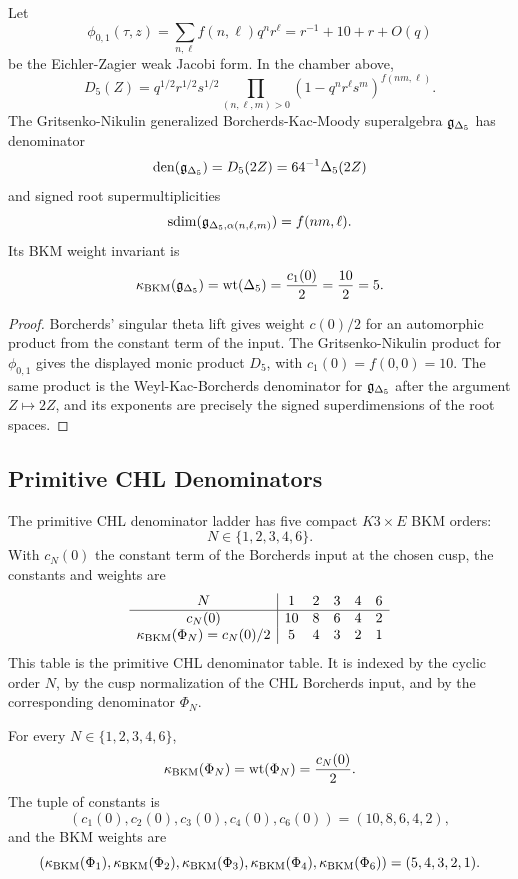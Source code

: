\begin{theorem}
\label{thm:delta5-bkm-denominator}
Let
\[
        \phi_{0,1}(\tau,z)=\sum_{n,\ell} f(n,\ell)q^nr^\ell
        =r^{-1}+10+r+O(q)
\]
be the Eichler-Zagier weak Jacobi form.  In the chamber above,
\[
        D_5(Z)=q^{1/2}r^{1/2}s^{1/2}
        \prod_{(n,\ell,m)>0}
        (1-q^nr^\ell s^m)^{f(nm,\ell)} .
\]
The Gritsenko-Nikulin generalized Borcherds-Kac-Moody superalgebra
\(\mathfrak{g}_{\Delta_5}\) has denominator
\[
        \operatorname{den}(\mathfrak{g}_{\Delta_5})=D_5(2Z)
        =64^{-1}\Delta_5(2Z)
\]
and signed root supermultiplicities
\[
        \operatorname{sdim}(\mathfrak{g}_{\Delta_5,\alpha(n,\ell,m)})=f(nm,\ell).
\]
Its BKM weight invariant is
\[
        \kappa_{\mathrm{BKM}}(\mathfrak{g}_{\Delta_5})
        =\operatorname{wt}(\Delta_5)
        =\frac{c_1(0)}{2}
        =\frac{10}{2}
        =5 .
\]
\end{theorem}

\begin{proof}
Borcherds' singular theta lift gives weight \(c(0)/2\) for an
automorphic product from the constant term of the input.  The
Gritsenko-Nikulin product for \(\phi_{0,1}\) gives the displayed
monic product \(D_5\), with \(c_1(0)=f(0,0)=10\).  The same product is
the Weyl-Kac-Borcherds denominator for \(\mathfrak{g}_{\Delta_5}\) after the
argument \(Z\mapsto 2Z\), and its exponents are precisely the signed
superdimensions of the root spaces.
\end{proof}

\subsection{Primitive CHL Denominators}
\label{subsec:primitive-chl-denominators}

The primitive CHL denominator ladder has five compact \(K3\times E\)
BKM orders:
\[
        N\in\{1,2,3,4,6\}.
\]
With \(c_N(0)\) the constant term of the Borcherds input at the chosen
cusp, the constants and weights are
\[
\begin{array}{c|ccccc}
N & 1 & 2 & 3 & 4 & 6\\
\hline
c_N(0) & 10 & 8 & 6 & 4 & 2\\
\kappa_{\mathrm{BKM}}(\Phi_N)=c_N(0)/2 & 5 & 4 & 3 & 2 & 1
\end{array}
\]
This table is the primitive CHL denominator table.  It is indexed by
the cyclic order \(N\), by the cusp normalization of the CHL Borcherds
input, and by the corresponding denominator \(\Phi_N\).

\begin{proposition}
\label{prop:primitive-chl-weight-formula}
For every \(N\in\{1,2,3,4,6\}\),
\[
        \kappa_{\mathrm{BKM}}(\Phi_N)=\operatorname{wt}(\Phi_N)=\frac{c_N(0)}{2}.
\]
The tuple of constants is
\[
        (c_1(0),c_2(0),c_3(0),c_4(0),c_6(0))
        =(10,8,6,4,2),
\]
and the BKM weights are
\[
        (\kappa_{\mathrm{BKM}}(\Phi_1),\kappa_{\mathrm{BKM}}(\Phi_2),\kappa_{\mathrm{BKM}}(\Phi_3),
        \kappa_{\mathrm{BKM}}(\Phi_4),\kappa_{\mathrm{BKM}}(\Phi_6))
        =(5,4,3,2,1).
\]
\end{proposition}

